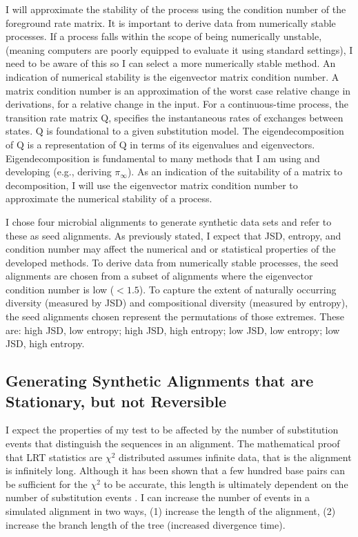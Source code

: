 I will approximate the stability of the process using the condition number of the foreground rate matrix. It is important to derive data from numerically stable processes. If a process falls within the scope of being numerically unstable, (meaning computers are poorly equipped to evaluate it using standard settings), I need to be aware of this so I can select a more numerically stable method. An indication of numerical stability is the eigenvector matrix condition number. A matrix condition number is an approximation of the worst case relative change in derivations, for a relative change in the input. For a continuous-time process, the transition rate matrix $\mathrm{Q}$, specifies the instantaneous rates of exchanges between states. $\mathrm{Q}$ is foundational to a given substitution model. The eigendecomposition of $\mathrm{Q}$ is a representation of $\mathrm{Q}$ in terms of its eigenvalues and eigenvectors. Eigendecomposition is fundamental to many methods that I am using and developing (e.g., deriving $\pi_{\infty}$). As an indication of the suitability of a matrix to decomposition, I will use the eigenvector matrix condition number to approximate the numerical stability of a process.

I chose four microbial alignments to generate synthetic data sets and refer to these as seed alignments. As previously stated, I expect that JSD, entropy, and condition number may affect the numerical and or statistical properties of the developed methods. To derive data from numerically stable processes, the seed alignments are chosen from a subset of alignments where the eigenvector condition number is low ($<1.5$). To capture the extent of naturally occurring diversity (measured by JSD) and compositional diversity (measured by entropy), the seed alignments chosen represent the permutations of those extremes. These are: high JSD, low entropy; high JSD, high entropy; low JSD, low entropy; low JSD, high entropy. 

\subsection{Generating Synthetic Alignments that are Stationary, but not Reversible}
I expect the properties of my test to be affected by the number of substitution events that distinguish the sequences in an alignment. The mathematical proof that LRT statistics are $\chi^{2}$ distributed assumes infinite data, that is the alignment is infinitely long. Although it has been shown that a few hundred base pairs can be sufficient for the $\chi^{2}$ to be accurate, this length is ultimately dependent on the number of substitution events \cite{Ota2000AppropriateParameters}. I can increase the number of events in a simulated alignment in two ways, (1) increase the length of the alignment, (2) increase the \gls{branch length} of the tree (increased divergence time). 

